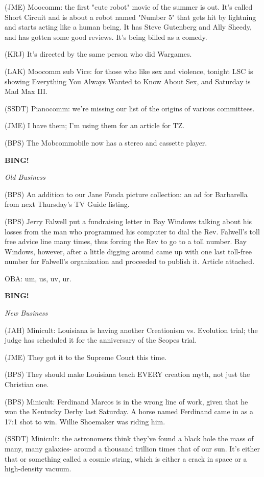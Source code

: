 \documentclass[12pt]{article}
\newcommand{\bing}{{\bf BING!} }
\newcommand{\goto}[1]{\bing \vskip 12pt \centerline{{\em{#1}}}}
\begin{document}
(JME) Moocomm: the first "cute robot" movie of the summer is out. It's called Short Circuit and is about a robot named "Number 5" that gets hit by lightning and starts acting like a human being. It has Steve Gutenberg and Ally Sheedy, and has gotten some good reviews. It's being billed as a comedy.

(KRJ) It's directed by the same person who did Wargames.

(LAK) Moocomm sub Vice: for those who like sex and violence, tonight LSC is showing Everything You Always Wanted to Know About Sex, and Saturday is Mad Max III.

(SSDT) Pianocomm: we're missing our list of the origins of various committees.

(JME) I have them; I'm using them for an article for TZ.

(BPS) The Mobcommobile now has a stereo and cassette player.

\goto{Old Business}

(BPS) An addition to our Jane Fonda picture collection: an ad for Barbarella from next Thursday's TV Guide listing.

(BPS) Jerry Falwell put a fundraising letter in Bay Windows talking about his losses from the man who programmed his computer to dial the Rev. Falwell's toll free advice line many times, thus forcing the Rev to go to a toll number. Bay Windows, however, after a little digging around came up with one last toll-free number for Falwell's organization and proceeded to publish it. Article attached.

OBA: um, us, uv, ur.

\goto{New Business}

(JAH) Minicult: Louisiana is having another Creationism vs. Evolution trial; the judge has scheduled it for the anniversary of the Scopes trial.

(JME) They got it to the Supreme Court this time.

(BPS) They should make Louisiana teach EVERY creation myth, not just the Christian one.

(BPS) Minicult: Ferdinand Marcos is in the wrong line of work, given that he won the Kentucky Derby last Saturday. A horse named Ferdinand came in as a 17:1 shot to win. Willie Shoemaker was riding him.

(SSDT) Minicult: the astronomers think they've found a black hole the mass of many, many galaxies- around a thousand trillion times that of our sun. It's either that or something called a cosmic string, which is either a crack in space or a high-density vacuum.
\end{document}
